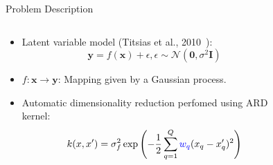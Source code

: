 \documentclass[final,hyperref={pdfpagelabels=false}]{beamer}
\begin{document}
\begin{frame}[t]
\begin{columns}[t]
\begin{column}{0.47\linewidth}
\begin{block}{Problem Description}
                \begin{columns}[t]
                    \begin{column}{0.8\textwidth}
                        \begin{itemize}
                            \setlength{\itemindent}{1in}
                            \item Latent variable model (Titsias et al., 2010~\cite{bgplvm}):
                            \begin{equation*}
                                \mathbf{y} = f(\mathbf{x}) + \epsilon, \epsilon \sim \mathcal{N}(\mathbf{0}, \sigma^2 \mathbf{I})
                            \end{equation*}
                            \item $f: \mathbf{x} \rightarrow \mathbf{y}$: Mapping given by a Gaussian process. \vspace*{1em}
                            \item Automatic dimensionality reduction perfomed using ARD kernel:
                            \begin{equation*}
                                \displaystyle
                                k(x, x') = \sigma_f^2 \exp \left( -\frac{1}{2} \sum_{q=1}^Q \textcolor{blue}{w_q} (x_q - x_q')^2 \right)
                            \end{equation*}
                            \vspace*{0.5em}
                        \end{itemize} 
                    \end{column}

                    \begin{column}{0.2\textwidth}
                        \begin{figure}[t]
                            \centering
                            \vspace*{0.5cm}
                        \end{figure}
                    \end{column}
                \end{columns}


\end{block}
\end{column}
\end{columns}
\end{frame}
\end{document}
